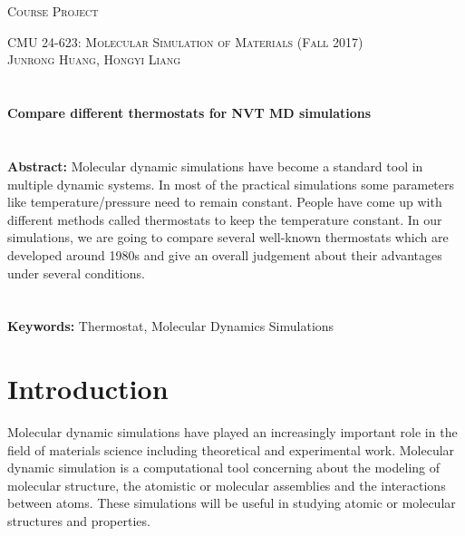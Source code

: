 \documentclass{article}
\begin{document}
\begin{spacing}{1}

\section*{}
\begin{center}
  \vspace{0.5em}
  \centerline{\textsc{\Large Course Project}}
  \vspace{1em}
  \textsc{\large CMU 24-623: Molecular Simulation of Materials (Fall 2017)} \\
  \vspace{1em}
  \textsc{\large Junrong Huang, Hongyi Liang} \\
\end{center}



\section*{}
\begin{center}
\centerline{\textbf{\Large Compare different thermostats for NVT MD simulations}}
\end{center}

\section*{}
\textbf{Abstract: } Molecular dynamic simulations have become a standard tool in multiple dynamic systems. In most of the practical simulations some parameters like temperature/pressure need to remain constant. People have come up with different methods called thermostats to keep the temperature constant. In our simulations, we are going to compare several well-known thermostats which are developed around 1980s and give an overall judgement about their advantages under several conditions.

\section*{}
\textbf{Keywords: } Thermostat, Molecular Dynamics Simulations


\section{Introduction}
Molecular dynamic simulations have played an increasingly important role in the field of materials science including theoretical and experimental work. Molecular dynamic simulation is a computational tool concerning about the modeling of molecular structure, the atomistic or molecular assemblies and the interactions between atoms. These simulations will be useful in studying atomic or molecular structures and properties. 


\end{spacing}
\end{document}
